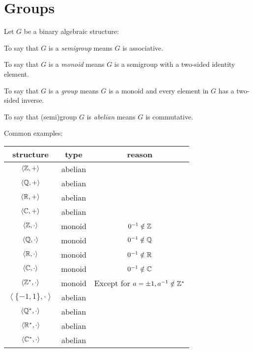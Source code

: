 \documentclass[letterpaper,12pt,fleqn]{article}
\newcommand{\bas}[2]{\left<#1,#2\right>}
\begin{document}
\section*{Groups}

\begin{definition}
  Let $G$ be a binary algebraic structure:

  To say that $G$ is a \emph{semigroup} means $G$ is associative.

  To say that $G$ is a \emph{monoid} means $G$ is a semigroup with a two-sided
  identity element.

  To say that $G$ is a \emph{group} means $G$ is a monoid and every element in
  $G$ has a two-sided inverse.

  To say that (semi)group $G$ is \emph{abelian} means $G$ is commutative.
\end{definition}

Common examples:

\begin{tabular}{c|c|c}
  structure & type & reason \\
  \hline
  $\bas{\Z}{+}$ & abelian & \\
  $\bas{\Q}{+}$ & abelian & \\
  $\bas{\R}{+}$ & abelian & \\
  $\bas{\C}{+}$ & abelian & \\
  \hline
  $\bas{\Z}{\cdot}$ & monoid & $0^{-1}\notin\mathbb{Z}$ \\
  $\bas{\Q}{\cdot}$ & monoid & $0^{-1}\notin\mathbb{Q}$ \\
  $\bas{\R}{\cdot}$ & monoid & $0^{-1}\notin\mathbb{R}$ \\
  $\bas{\C}{\cdot}$ & monoid & $0^{-1}\notin\mathbb{C}$ \\
  \hline
  $\bas{\Z^*}{\cdot}$ & monoid & Except for $a=\pm1, a^{-1}\notin\mathbb{Z}^*$ \\
  $\bas{\{-1,1\}}{\cdot}$ & abelian & \\
  \hline
  $\bas{\Q^*}{\cdot}$ & abelian \\
  $\bas{\R^*}{\cdot}$ & abelian \\
  $\bas{\C^*}{\cdot}$ & abelian \\
\end{tabular}

\bigskip
\end{document}
